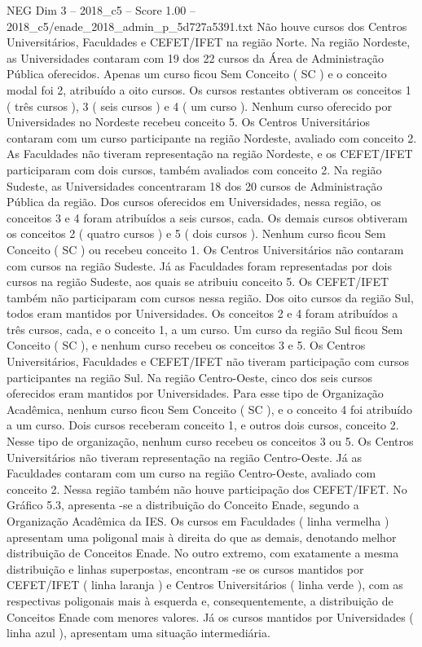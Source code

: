 \begin{textsample}{NEG Dim 3 – 2018\_c5 – Score 1.00 – 2018\_c5/enade\_2018\_admin\_p\_5d727a5391.txt}
Não houve cursos dos Centros Universitários, Faculdades e CEFET/IFET na região Norte.
Na região Nordeste, as Universidades contaram com 19 dos 22 cursos da Área de Administração Pública oferecidos.
Apenas um curso ficou Sem Conceito ( SC ) e o conceito modal foi 2, atribuído a oito cursos.
Os cursos restantes obtiveram os conceitos 1 ( três cursos ), 3 ( seis cursos ) e 4 ( um curso ).
Nenhum curso oferecido por Universidades no Nordeste recebeu conceito 5.
Os Centros Universitários contaram com um curso participante na região Nordeste, avaliado com conceito 2.
As Faculdades não tiveram representação na região Nordeste, e os CEFET/IFET participaram com dois cursos, também avaliados com conceito 2.
Na região Sudeste, as Universidades concentraram 18 dos 20 cursos de Administração Pública da região.
Dos cursos oferecidos em Universidades, nessa região, os conceitos 3 e 4 foram atribuídos a seis cursos, cada.
Os demais cursos obtiveram os conceitos 2 ( quatro cursos ) e 5 ( dois cursos ).
Nenhum curso ficou Sem Conceito ( SC ) ou recebeu conceito 1.
Os Centros Universitários não contaram com cursos na região Sudeste.
Já as Faculdades foram representadas por dois cursos na região Sudeste, aos quais se atribuiu conceito 5.
Os CEFET/IFET também não participaram com cursos nessa região.
Dos oito cursos da região Sul, todos eram mantidos por Universidades.
Os conceitos 2 e 4 foram atribuídos a três cursos, cada, e o conceito 1, a um curso.
Um curso da região Sul ficou Sem Conceito ( SC ), e nenhum curso recebeu os conceitos 3 e 5.
Os Centros Universitários, Faculdades e CEFET/IFET não tiveram participação com cursos participantes na região Sul.
Na região Centro-Oeste, cinco dos seis cursos oferecidos eram mantidos por Universidades.
Para esse tipo de Organização Acadêmica, nenhum curso ficou Sem Conceito ( SC ), e o conceito 4 foi atribuído a um curso.
Dois cursos receberam conceito 1, e outros dois cursos, conceito 2.
Nesse tipo de organização, nenhum curso recebeu os conceitos 3 ou 5.
Os Centros Universitários não tiveram representação na região Centro-Oeste.
Já as Faculdades contaram com um curso na região Centro-Oeste, avaliado com conceito 2.
Nessa região também não houve participação dos CEFET/IFET.
No Gráfico 5.3, apresenta -se a distribuição do Conceito Enade, segundo a Organização Acadêmica da IES.
Os cursos em Faculdades ( linha vermelha ) apresentam uma poligonal mais à direita do que as demais, denotando melhor distribuição de Conceitos Enade.
No outro extremo, com exatamente a mesma distribuição e linhas superpostas, encontram -se os cursos mantidos por CEFET/IFET ( linha laranja ) e Centros Universitários ( linha verde ), com as respectivas poligonais mais à esquerda e, consequentemente, a distribuição de Conceitos Enade com menores valores.
Já os cursos mantidos por Universidades ( linha azul ), apresentam uma situação intermediária.

\end{textsample}
